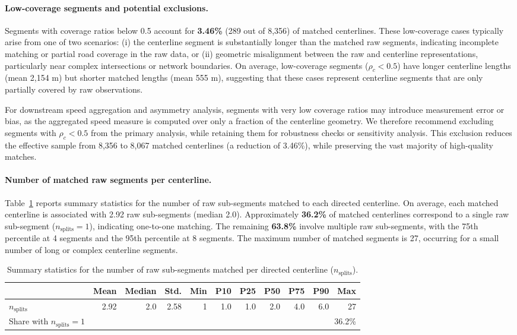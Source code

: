 \documentclass[12pt]{article}
\begin{document}
	\paragraph{Low-coverage segments and potential exclusions.}
	Segments with coverage ratios below 0.5 account for \textbf{3.46\%} (289 out of
	8,356) of matched centerlines. These low-coverage cases typically arise from one of
	two scenarios: (i) the centerline segment is substantially longer than the matched
	raw segments, indicating incomplete matching or partial road coverage in the raw
	data, or (ii) geometric misalignment between the raw and centerline representations,
	particularly near complex intersections or network boundaries. On average,
	low-coverage segments ($\rho_c < 0.5$) have longer centerline lengths (mean 2,154 m)
	but shorter matched lengths (mean 555 m), suggesting that these cases represent
	centerline segments that are only partially covered by raw observations.

	For downstream speed aggregation and asymmetry analysis, segments with very low
	coverage ratios may introduce measurement error or bias, as the aggregated speed
	measure is computed over only a fraction of the centerline geometry. We therefore
	recommend excluding segments with $\rho_c < 0.5$ from the primary analysis, while
	retaining them for robustness checks or sensitivity analysis. This exclusion
	reduces the effective sample from 8,356 to 8,067 matched centerlines (a reduction of
	3.46\%), while preserving the vast majority of high-quality matches.

	\paragraph{Number of matched raw segments per centerline.}
	Table~\ref{tab:n-splits-summary} reports summary statistics for the number of raw
	sub-segments matched to each directed centerline. On average, each matched
	centerline is associated with 2.92 raw sub-segments (median 2.0). Approximately
	\textbf{36.2\%} of matched centerlines correspond to a single raw sub-segment
	($n_{\text{splits}} = 1$), indicating one-to-one matching. The remaining
	\textbf{63.8\%} involve multiple raw sub-segments, with the 75th percentile at 4
	segments and the 95th percentile at 8 segments. The maximum number of matched
	segments is 27, occurring for a small number of long or complex centerline
	segments.

	\begin{table}[h!]
		\centering
		\caption{Summary statistics for the number of raw sub-segments matched per directed centerline ($n_{\text{splits}}$).}
		\label{tab:n-splits-summary}
		\begin{tabular}{l r r r r r r r r r r}
			\toprule
			& Mean & Median & Std. & Min & P10 & P25 & P50 & P75 & P90 & Max \\
			\midrule
			$n_{\text{splits}}$ 
			& 2.92 & 2.0 & 2.58 & 1 & 1.0 & 1.0 & 2.0 & 4.0 & 6.0 & 27 \\
			Share with $n_{\text{splits}}=1$ 
			& \multicolumn{10}{r}{36.2\%} \\
			\bottomrule
		\end{tabular}
	\end{table}
\end{document}
